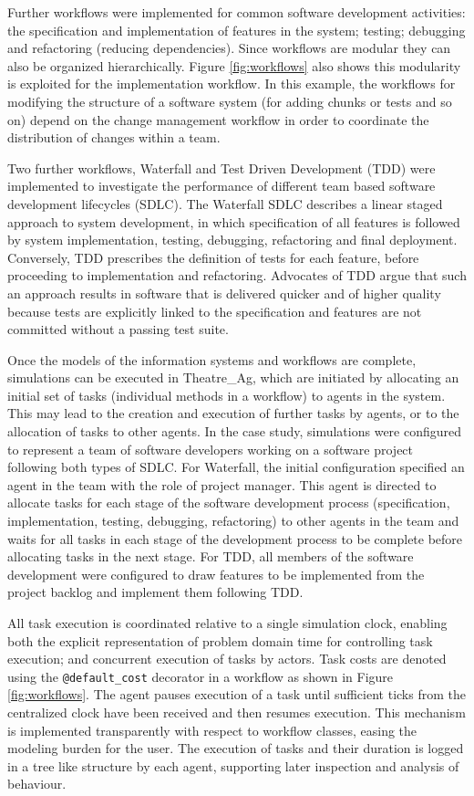 \documentclass{llncs}
\begin{document}
Further workflows were implemented for common software development activities: the specification and implementation of
features in the system; testing; debugging and refactoring (reducing dependencies).  Since workflows are modular they
can also be organized hierarchically.  Figure \ref{fig:workflows} also shows this modularity is exploited for the
implementation workflow. In this example, the workflows for modifying the structure of a software system (for adding
chunks or tests and so on) depend on the change management workflow in order to coordinate the distribution of changes
within a team.

Two further workflows, Waterfall and Test Driven Development (TDD) were implemented to investigate the performance of
different team based software development lifecycles (SDLC).  The Waterfall SDLC \citep{benington83production} describes
a linear staged approach to system development, in which specification of all features is followed by system
implementation, testing, debugging, refactoring and final deployment.  Conversely, TDD \citep{beck02test} prescribes the
definition of tests for each feature, before proceeding to implementation and refactoring.  Advocates of TDD argue that
such an approach results in software that is delivered quicker and of higher quality because tests are explicitly linked
to the specification and features are not committed without a passing test suite.

Once the models of the information systems and workflows are complete, simulations can be executed in Theatre\_Ag, which
are initiated by allocating an initial set of tasks (individual methods in a workflow) to agents in the system. This may
lead to the creation and execution of further tasks by agents, or to the allocation of tasks to other agents.  In the
case study, simulations were configured to represent a team of software developers working on a software project
following both types of SDLC.  For Waterfall, the initial configuration specified an agent in the team with the role of
project manager.  This agent is directed to allocate tasks for each stage of the software development process
(specification, implementation, testing, debugging, refactoring) to other agents in the team and waits for all tasks in
each stage of the development process to be complete before allocating tasks in the next stage.  For TDD, all members of
the software development were configured to draw features to be implemented from the project backlog and implement them
following TDD.

All task execution is coordinated relative to a single simulation clock, enabling both the explicit representation of
problem domain time for controlling task execution; and concurrent execution of tasks by actors.  Task costs are denoted
using the \lstinline!@default_cost! decorator in a workflow as shown in Figure \ref{fig:workflows}.  The agent pauses
execution of a task until sufficient ticks from the centralized clock have been received and then resumes execution.
This mechanism is implemented transparently with respect to workflow classes, easing the modeling burden for the user.
The execution of tasks and their duration is logged in a tree like structure by each agent, supporting later inspection
and analysis of behaviour.
\end{document}
